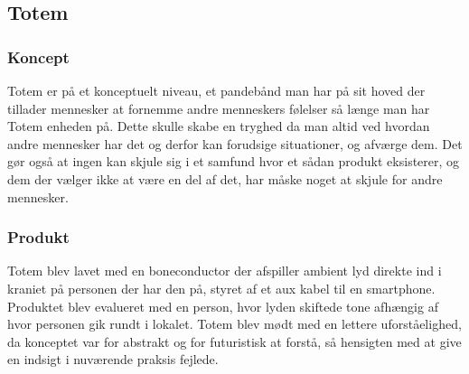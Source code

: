 
\subsection{Totem}
\subsubsection{Koncept}
Totem er på et konceptuelt niveau, et pandebånd man har på sit hoved der tillader mennesker at fornemme andre menneskers følelser så længe man har Totem enheden på. Dette skulle skabe en tryghed da man altid ved hvordan andre mennesker har det og derfor kan forudsige situationer, og afværge dem. Det gør også at ingen kan skjule sig i et samfund hvor et sådan produkt eksisterer, og dem der vælger ikke at være en del af det, har måske noget at skjule for andre mennesker. 

\subsubsection{Produkt}
Totem blev lavet med en boneconductor der afspiller ambient lyd direkte ind i kraniet på personen der har den på, styret af et aux kabel til en smartphone. Produktet blev evalueret med en person, hvor lyden skiftede tone afhængig af hvor personen gik rundt i lokalet. Totem blev mødt med en lettere uforståelighed, da konceptet var for abstrakt og for futuristisk at forstå, så hensigten med at give en indsigt i nuværende praksis fejlede. 


